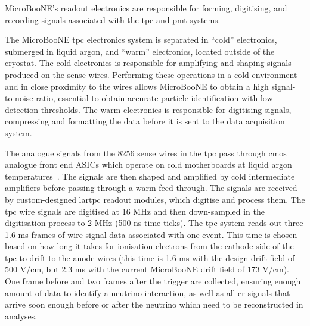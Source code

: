 MicroBooNE's readout electronics are responsible for forming, digitising, and recording signals associated with the \acrshort{tpc} and \acrshort{pmt} systems. 

The MicroBooNE \acrshort{tpc} electronics system is separated in ``cold'' electronics, submerged in liquid argon, and ``warm'' electronics, located outside of the cryostat. The cold electronics is responsible for amplifying and shaping signals produced on the sense wires. Performing these operations in a cold environment and in close proximity to the wires allows MicroBooNE to obtain a high signal-to-noise ratio, essential to obtain accurate particle identification with low detection thresholds. The warm electronics is responsible for digitising signals, compressing and formatting the data before it is sent to the data acquisition system.

The analogue signals from the 8256 sense wires in the \acrshort{tpc} pass through \acrfull{cmos} analogue front end ASICs which operate on cold motherboards at liquid argon temperatures~\cite{det}. The signals are then shaped and amplified by cold intermediate amplifiers before passing through a warm feed-through. The signals are received by custom-designed \acrshort{lartpc} readout modules, which digitise and process them. The \acrshort{tpc} wire signals are digitised at 16 MHz and then down-sampled in the digitisation process to 2 MHz (500 ns time-ticks). The \acrshort{tpc} system reads out three 1.6 ms frames of wire signal data associated with one event. This time is chosen based on how long it takes for ionisation electrons from the cathode side of the \acrshort{tpc} to drift to the anode wires (this time is 1.6 ms with the design drift field of 500 V/cm, but 2.3 ms with the current MicroBooNE drift field of 173 V/cm). One frame before and two frames after the trigger are collected, ensuring enough amount of data to identify a neutrino interaction, as well as all \acrshort{cr} signals that arrive soon enough before or after the neutrino which need to be reconstructed in analyses.

